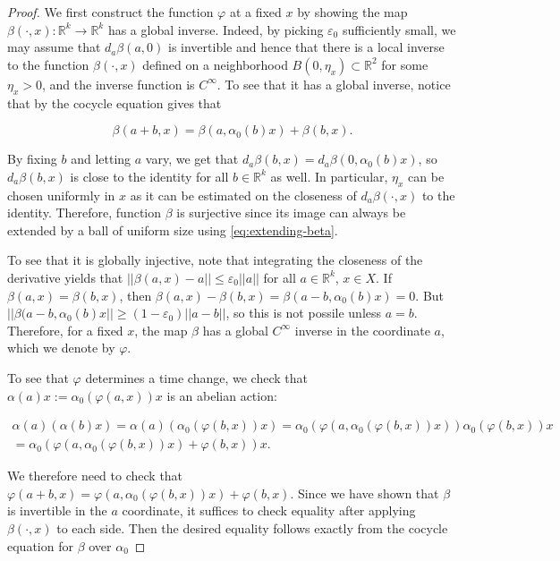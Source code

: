 \documentclass[12pt]{amsart}
\theoremstyle{definition}
\theoremstyle{remark}
\numberwithin{equation}{section}
\newcommand{\id}{\mathrm{Id}}
\newcommand{\R}{\mathbb{R}}
\newcommand{\norm}[1]{{\left|\left| #1 \right|\right|}}
\newcommand{\ve}{\varepsilon}
\newtheorem{Structural Stability Theorem}[theorem]{Structural Stability Theorem}
\begin{document}
\begin{proof}
We first construct the function $\varphi$ at a fixed $x$ by showing the map $\beta( \cdot,x) : \R^k \to \R^k$ has a global inverse. Indeed, by picking $\ve_0$ sufficiently small, we may assume that $d_{ a}\beta(a,0)$ is invertible and hence that there is a local inverse to the function $\beta(\cdot,x)$ defined on a neighborhood $B(0,\eta_x) \subset \R^2$ for some $\eta_x > 0$, and the inverse function is $C^\infty$. %
To see that it has a global inverse, notice that by the cocycle equation gives that 

\begin{equation}
\label{eq:extending-beta}
\beta(a+b,x) = \beta(a,\alpha_0(b)x) + \beta(b,x).
\end{equation}

 By fixing $b$ and letting $a$ vary, we get that $d_a\beta(b,x) = d_a\beta(0,\alpha_0(b)x)$, so $d_a\beta(b,x)$ is close to the identity for all $b \in \R^k$ as well. In particular, $\eta_x$ can be chosen uniformly in $x$ {  as it can be estimated on the closeness of $d_a\beta(\cdot,x)$ to the identity. Therefore, function $\beta$ is surjective   since its image can always be extended by a ball of uniform size using \eqref{eq:extending-beta}.}

To see that it is globally injective, note that integrating the closeness of the derivative yields that $\norm{\beta(a,x)-a} \le \ve_0\norm{a}$ for all $ a \in \R^k$, $x \in X$. If $\beta(a,x) = \beta(b,x)$, then $\beta(a,x) - \beta(b,x) = \beta(a-b,\alpha_0(b)x) = 0$. But $\norm{\beta(a-b,\alpha_0(b)x} \ge (1-\ve_0)\norm{a-b}$, so this is not possile unless $a = b$. Therefore, for a fixed $x$, the map $\beta$ has a global $C^\infty$ inverse in the coordinate $a$, which we denote by $\varphi$.

To see that $\varphi$ determines a time change, we check that $\alpha(a)x := \alpha_0(\varphi(a,x))x$ is an abelian action:

\begin{multline*} \alpha(a)(\alpha(b)x) = \alpha(a)( \alpha_0(\varphi(b,x))x ) = \alpha_0(\varphi(a,\alpha_0(\varphi(b,x))x))\alpha_0(\varphi(b,x))x \\
 = \alpha_0( \varphi(a,\alpha_0(\varphi(b,x))x)+\varphi(b,x)) x.
 \end{multline*}

We therefore need to check that $\varphi(a+b,x) = \varphi(a,\alpha_0(\varphi(b,x))x)+\varphi(b,x)$. Since we have shown that $\beta$ is invertible in the $a$ coordinate, it suffices to check equality { after} applying $\beta(\cdot,x)$ to each side. Then the desired equality follows exactly from the cocycle equation for $\beta$ over $\alpha_0$


\end{proof}
\end{document}
